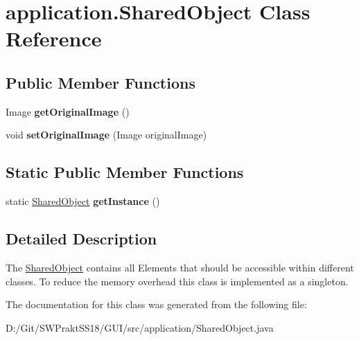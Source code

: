 \hypertarget{classapplication_1_1_shared_object}{}\section{application.\+Shared\+Object Class Reference}
\label{classapplication_1_1_shared_object}
\subsection*{Public Member Functions}
\begin{DoxyCompactItemize}
\item 
\mbox{\label{classapplication_1_1_shared_object_a089d7d6170ca682281e9b1da46144f12}} 
Image {\bfseries get\+Original\+Image} ()
\item 
\mbox{\label{classapplication_1_1_shared_object_a9fb756f502b97ba6a9743717866b1927}} 
void {\bfseries set\+Original\+Image} (Image original\+Image)
\end{DoxyCompactItemize}
\subsection*{Static Public Member Functions}
\begin{DoxyCompactItemize}
\item 
\mbox{\label{classapplication_1_1_shared_object_a35417b0510f7b9ebf85ac1656ed005ff}} 
static \mbox{\hyperlink{classapplication_1_1_shared_object}{Shared\+Object}} {\bfseries get\+Instance} ()
\end{DoxyCompactItemize}


\subsection{Detailed Description}
The \mbox{\hyperlink{classapplication_1_1_shared_object}{Shared\+Object}} contains all Elements that should be accessible within different classes. To reduce the memory overhead this class is implemented as a singleton. 

The documentation for this class was generated from the following file\+:\begin{DoxyCompactItemize}
\item 
D\+:/\+Git/\+S\+W\+Prakt\+S\+S18/\+G\+U\+I/src/application/Shared\+Object.\+java\end{DoxyCompactItemize}
